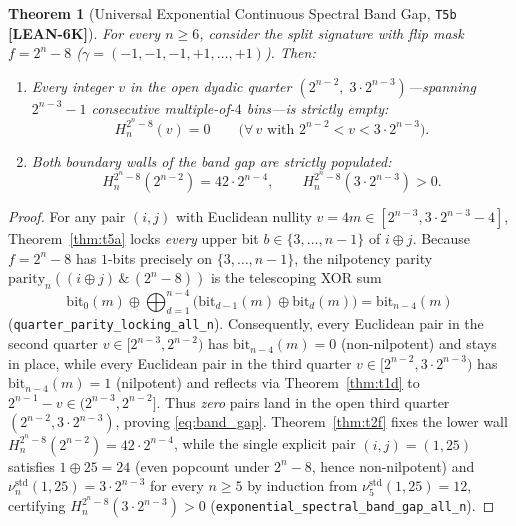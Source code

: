 \documentclass[11pt,reqno]{amsart}
\newcommand{\code}[1]{\textnormal{\texttt{\small\nolinkurl{#1}}}}
\theoremstyle{plain}
\newtheorem{theorem}{Theorem}[section]
\theoremstyle{definition}
\theoremstyle{remark}
\newcommand{\tagLean}{\mbox{\textsf{\textbf{\color{oiBlue}[LEAN-6K]}}}}
\newcommand{\std}{\mathrm{std}}
\newcommand{\parbit}{\mathrm{parity}}
\begin{document}
\begin{theorem}[Universal Exponential Continuous Spectral Band Gap, \texttt{T5b} \tagLean]
\label{thm:t5b}
For every $n \ge 6$, consider the split signature with flip mask $f = 2^n - 8$
($\gamma = (-1, -1, -1, +1, \dots, +1)$). Then:
\begin{enumerate}[leftmargin=2em]
  \item Every integer $v$ in the open dyadic quarter $(2^{n-2},\; 3 \cdot 2^{n-3})$---spanning
    $2^{n-3} - 1$ consecutive multiple-of-$4$ bins---is strictly empty:
    \begin{equation}
    \label{eq:band_gap}
      H_n^{2^n - 8}(v) = 0 \qquad \bigl(\forall\, v \text{ with } 2^{n-2} < v < 3 \cdot 2^{n-3}\bigr).
    \end{equation}
  \item Both boundary walls of the band gap are strictly populated:
    \begin{equation}
      H_n^{2^n - 8}(2^{n-2}) = 42 \cdot 2^{n-4}, \qquad
      H_n^{2^n - 8}(3 \cdot 2^{n-3}) > 0.
    \end{equation}
\end{enumerate}
\end{theorem}

\begin{proof}
For any pair $(i, j)$ with Euclidean nullity $v = 4m \in [2^{n-3}, 3 \cdot 2^{n-3} - 4]$,
Theorem~\ref{thm:t5a} locks \emph{every} upper bit $b \in \{3, \dots, n - 1\}$ of $i \oplus j$.
Because $f = 2^n - 8$ has $1$-bits precisely on $\{3, \dots, n - 1\}$, the nilpotency parity
$\parbit_n((i \oplus j) \,\&\, (2^n - 8))$ is the telescoping XOR sum
\[
  \mathrm{bit}_0(m) \oplus \bigoplus_{d=1}^{n-4} \bigl(\mathrm{bit}_{d-1}(m) \oplus \mathrm{bit}_d(m)\bigr)
  = \mathrm{bit}_{n-4}(m)
\]
(\code{quarter_parity_locking_all_n}). Consequently, every Euclidean pair in the second quarter
$v \in [2^{n-3}, 2^{n-2})$ has $\mathrm{bit}_{n-4}(m) = 0$ (non-nilpotent) and stays in place,
while every Euclidean pair in the third quarter $v \in [2^{n-2}, 3 \cdot 2^{n-3})$ has
$\mathrm{bit}_{n-4}(m) = 1$ (nilpotent) and reflects via Theorem~\ref{thm:t1d} to
$2^{n-1} - v \in (2^{n-3}, 2^{n-2}]$. Thus \emph{zero} pairs land in the open third quarter
$(2^{n-2}, 3 \cdot 2^{n-3})$, proving \eqref{eq:band_gap}. Theorem~\ref{thm:t2f} fixes the lower
wall $H_n^{2^n - 8}(2^{n-2}) = 42 \cdot 2^{n-4}$, while the single explicit pair $(i, j) = (1, 25)$
satisfies $1 \oplus 25 = 24$ (even popcount under $2^n - 8$, hence non-nilpotent) and
$\nu_n^{\std}(1, 25) = 3 \cdot 2^{n-3}$ for every $n \ge 5$ by induction from $\nu_5^{\std}(1, 25) = 12$,
certifying $H_n^{2^n - 8}(3 \cdot 2^{n-3}) > 0$ (\code{exponential_spectral_band_gap_all_n}).
\end{proof}
\end{document}
